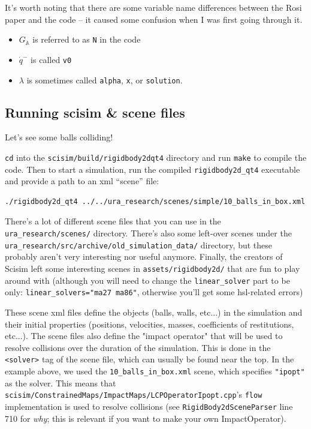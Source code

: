 \documentclass[12pt]{article}
\newcommand{\GA}{G_{\mathbb{A}}}
\begin{document}
It's worth noting that there are some variable name differences between the Rosi paper and the code
-- it caused some confusion when I was first going through it.
\begin{itemize}
    \item $\GA{}$ is referred to as \texttt{N} in the code
    \item $\dot{q}^-$ is called \texttt{v0}
    \item $\lambda$ is sometimes called \texttt{alpha}, \texttt{x}, or \texttt{solution}.
\end{itemize}

\subsection{Running scisim \& scene files}

Let's see some balls colliding!

\texttt{cd} into the \texttt{scisim/build/rigidbody2dqt4} directory and run \texttt{make} to compile the code.
Then to start a simulation, run the compiled \texttt{rigidbody2d\_qt4} executable and provide a path to an xml ``scene'' file:
\\\begin{verbatim}
./rigidbody2d_qt4 ../../ura_research/scenes/simple/10_balls_in_box.xml
\end{verbatim}

There's a lot of different scene files that you can use in the \texttt{ura\_research/scenes/} directory.
There's also some left-over scenes under the
\\\texttt{ura\_research/src/archive/old\_simulation\_data/} directory,
but these probably aren't very interesting nor useful anymore.
Finally, the creators of Scisim left some interesting scenes in \texttt{assets/rigidbody2d/} that are fun to play around with
(although you will need to change the \texttt{linear\_solver} part to be only: \texttt{linear\_solvers="ma27 ma86"},
otherwise you'll get some hsl-related errors)

These scene xml files define the objects (balls, walls, etc...) in the simulation and their initial properties
(positions, velocities, masses, coefficients of restitutions, etc...).
The scene files also define the "impact operator" that will be used to resolve collisions over the duration of the simulation.
This is done in the \texttt{<solver>} tag of the scene file, which can usually be found near the top.
In the example above, we used the \texttt{10\_balls\_in\_box.xml} scene,
which specifies \texttt{"ipopt"} as the solver.
This means that
\\\texttt{scisim/ConstrainedMaps/ImpactMaps/LCPOperatorIpopt.cpp}'s \texttt{flow}
implementation is used to resolve collisions
(see \texttt{RigidBody2dSceneParser} line 710 for \textit{why};
this is relevant if you want to make your own ImpactOperator).
\end{document}
